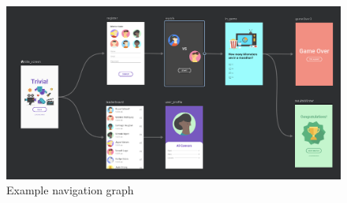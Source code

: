 \begin{itemize}
    \begin{figure}[ht]
        \centering
        \includegraphics[width=\linewidth]{images/navigation_graph.png}
        \caption{Example navigation graph \cite{Figure_3}}
        \label{fig:navgraph}
    \end{figure}
    
\end{itemize}